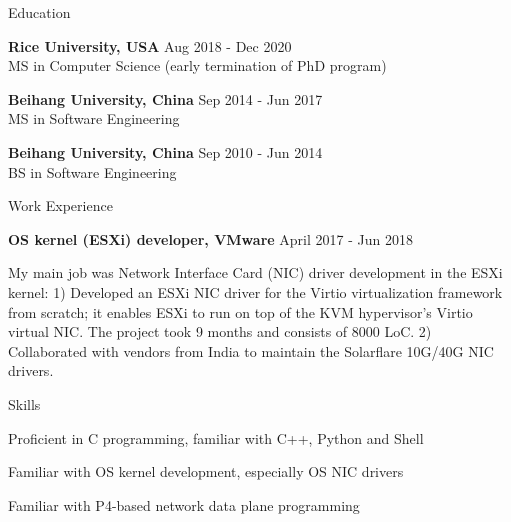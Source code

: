 \documentclass{resume} %
\begin{document}


\begin{rSection}{Education}

{\bf Rice University, USA} \hfill { Aug 2018 - Dec 2020}
\\ MS in Computer Science  (early termination of PhD program)

{\bf Beihang University, China} \hfill { Sep 2014 - Jun 2017}
\\ MS in Software Engineering

{\bf Beihang University, China} \hfill { Sep 2010 - Jun 2014}
\\ BS in Software Engineering

\end{rSection}



\begin{rSection}{Work Experience}

\item {\bf OS kernel (ESXi) developer, VMware} \hfill { April 2017 - Jun 2018}

My main job was Network Interface Card (NIC) driver development in the
ESXi kernel:
1) Developed an ESXi NIC driver for the Virtio virtualization framework from
scratch; it enables ESXi to run on top of the KVM hypervisor's Virtio virtual
NIC. The project took 9 months and consists of 8000 LoC.
2) Collaborated with vendors from India to maintain the Solarflare 10G/40G NIC drivers.


\end{rSection}



\begin{rSection}{Skills} \itemsep -3pt

\item Proficient in C programming, familiar with C++, Python and Shell
\item Familiar with OS kernel development, especially OS NIC drivers
\item Familiar with P4-based network data plane programming

\end{rSection}
\end{document}
